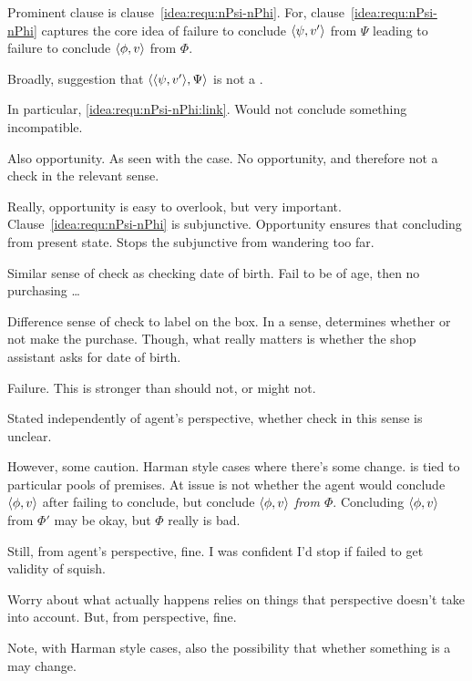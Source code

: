 \begin{note}[Check]
  Prominent clause is clause~\ref{idea:requ:nPsi-nPhi}.
  For, clause~\ref{idea:requ:nPsi-nPhi} captures the core idea of failure to conclude \(\langle \psi, v' \rangle\) from \(\Psi\) leading to failure to conclude \(\langle \phi, v \rangle\) from \(\Phi\).

  Broadly, suggestion that \(\langle \langle \psi, v' \rangle, \Psi \rangle\) is not a \fc{}.

  In particular, \ref{idea:requ:nPsi-nPhi:link}.
  Would not conclude something incompatible.

  Also opportunity.
  As seen with the \citeauthor{Dretske:1970to} case.
  No opportunity, and therefore not a check in the relevant sense.

  Really, opportunity is easy to overlook, but very important.
  Clause~\ref{idea:requ:nPsi-nPhi} is subjunctive.
  Opportunity ensures that concluding from present state.
  Stops the subjunctive from wandering too far.

  Similar sense of check as checking date of birth.
  Fail to be of age, then no purchasing \dots

  Difference sense of check to label on the box.
  In a sense, determines whether or not make the purchase.
  Though, what really matters is whether the shop assistant asks for date of birth.

  Failure.
  This is stronger than should not, or might not.
\end{note}

\begin{note}
  Stated independently of agent's perspective, whether check in this sense is unclear.

  However, some caution.
  Harman style cases where there's some change.
  \requ{} is tied to particular pools of premises.
  At issue is not whether the agent would conclude \(\langle \phi, v \rangle\) after failing to conclude, but conclude \(\langle \phi, v \rangle\) \emph{from \(\Phi\)}.
  Concluding \(\langle \phi, v \rangle\) from \(\Phi'\) may be okay, but \(\Phi\) really is bad.

  Still, from agent's perspective, fine.
  I was confident I'd stop if failed to get validity of squish.

  Worry about what actually happens relies on things that perspective doesn't take into account.
  But, from perspective, fine.

  Note, with Harman style cases, also the possibility that whether something is a \requ{} may change.
\end{note}

